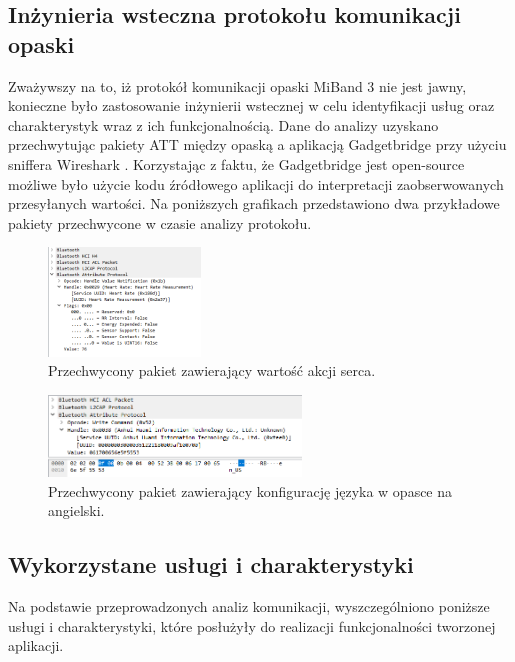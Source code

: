 \subsection{Inżynieria wsteczna protokołu komunikacji opaski}
Zważywszy na to, iż protokół komunikacji opaski MiBand 3 nie jest jawny, konieczne było zastosowanie inżynierii wstecznej w celu identyfikacji usług oraz charakterystyk wraz z ich funkcjonalnością. Dane do analizy uzyskano przechwytując pakiety ATT między opaską a aplikacją Gadgetbridge \cite{Gadgetbridge} przy użyciu sniffera Wireshark \cite{Wireshark}. Korzystając z faktu, że Gadgetbridge jest open-source możliwe było użycie kodu źródłowego aplikacji do interpretacji zaobserwowanych przesyłanych wartości. Na poniższych grafikach przedstawiono dwa przykładowe pakiety przechwycone w czasie analizy protokołu. 
\begin{figure}[H]
    \begin{center}
        \includegraphics[width=0.36\textwidth]{HRPacket.png}
    \end{center}
    \caption{{\color{dgray}Przechwycony pakiet zawierający wartość akcji serca.}} \label{hrPacket}
\end{figure}
\begin{figure}[H]
    \begin{center}
        \includegraphics[width=0.60\textwidth]{SetLanguageATTPacket.png}
    \end{center}
    \caption{{\color{dgray}Przechwycony pakiet zawierający konfigurację języka w opasce na angielski.}} \label{langPacket}
\end{figure}
\subsection{Wykorzystane usługi i charakterystyki}
Na podstawie przeprowadzonych analiz komunikacji, wyszczególniono poniższe usługi i charakterystyki, które posłużyły do realizacji funkcjonalności tworzonej aplikacji.

